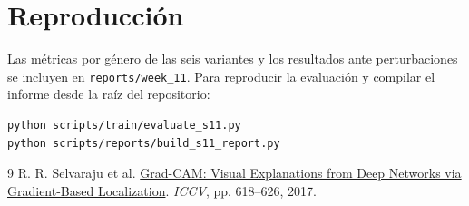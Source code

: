 \documentclass[11pt,a4paper]{article}
\begin{document}
\section{Reproducción}
Las métricas por género de las seis variantes y los resultados ante
perturbaciones se incluyen en \texttt{reports/week\_11}. Para reproducir
la evaluación y compilar el informe desde la raíz del repositorio:

\begin{verbatim}
python scripts/train/evaluate_s11.py
python scripts/reports/build_s11_report.py
\end{verbatim}

\begin{thebibliography}{9}
R. R. Selvaraju et al.
\href{https://openaccess.thecvf.com/content_iccv_2017/html/Selvaraju_Grad-CAM_Visual_Explanations_ICCV_2017_paper.html}{Grad-CAM: Visual Explanations from Deep Networks via Gradient-Based Localization}.
\emph{ICCV}, pp. 618--626, 2017.
\end{thebibliography}
\end{document}
